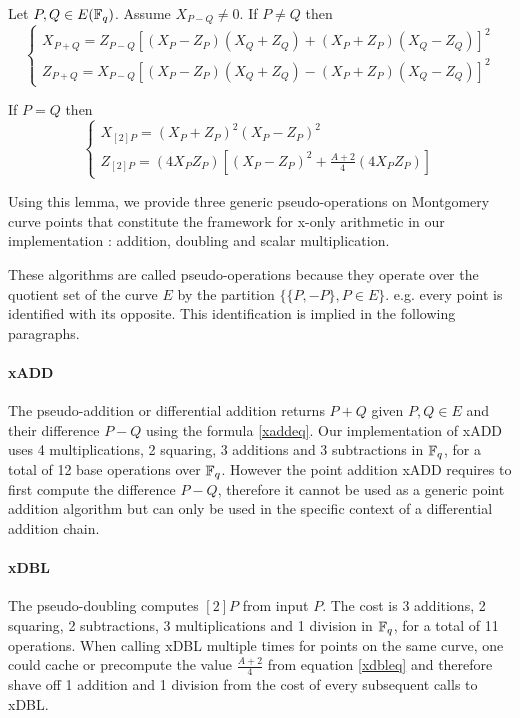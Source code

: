\documentclass[../main.tex]{subfilesubs}
\begin{document}
\begin{lemma}Let $P,Q\in E(\mathbb{F}_q)$.  Assume $X_{P-Q}\neq0$.
	 If $P\neq Q$ then  \begin{equation}\label{xaddeq}\left\{\begin{array}{l}
	 	X_{P+Q} = Z_{P-Q}[(X_P-Z_P)(X_Q+Z_Q) + (X_P+Z_P)(X_Q-Z_Q)]^2\\
	 	Z_{P+Q} = X_{P-Q}[(X_P-Z_P)(X_Q+Z_Q) - (X_P+Z_P)(X_Q-Z_Q)]^2
	 \end{array}\right.\end{equation}

 	If $P=Q$ then \begin{equation}\label{xdbleq}\left\{\begin{array}{l}
 		X_{[2]P}=(X_P + Z_P)^2(X_P - Z_P)^2 \\
 		Z_{[2]P}=(4 X_P Z_P)[(X_P - Z_P)^2 + \frac{A+2}{4}(4 X_P Z_P)]
 	\end{array}\right.\end{equation}
\end{lemma}

Using this lemma, we provide three generic pseudo-operations on Montgomery curve points that constitute the framework for x-only arithmetic in our implementation : addition, doubling and scalar multiplication.

These algorithms are called pseudo-operations because they operate over the quotient set of the curve $E$ by the partition
$\lbrace\lbrace P, -P\rbrace, P\in E\rbrace$. e.g. every point is identified with its opposite. This identification is implied in the following paragraphs.

\paragraph{xADD}The pseudo-addition or differential addition  returns $P+Q$ given $P,Q\in E$ and their difference $P-Q$ using the formula \eqref{xaddeq}.
Our implementation of xADD uses 4 multiplications, 2 squaring,  3 additions and 3 subtractions in $\mathbb{F}_q$, for a total of  12 base operations over $\mathbb{F}_q$.
However the point addition xADD requires to first compute the difference $P-Q$, therefore it cannot be used as a generic point addition algorithm but can only be used in the specific context of a differential addition chain.

\paragraph{xDBL}The pseudo-doubling  computes $[2]P$ from input $P$.  The cost is 3 additions, 2 squaring, 2 subtractions, 3 multiplications and 1 division in $\mathbb{F}_q$, for a total of 11 operations. When calling xDBL multiple times for points on the same curve, one could cache or precompute the value $\frac{A+2}{4}$ from equation \eqref{xdbleq} and therefore shave off 1 addition and 1 division from the cost of every subsequent calls to xDBL.
\end{document}
